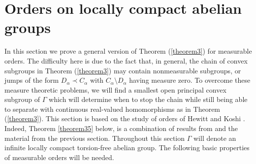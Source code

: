 





\section{Orders on locally compact abelian groups}
%
\newtheorem{theorem3.1}{Theorem}[section]
\newtheorem{remark3.2}[theorem3.1]{Remark}
\newtheorem{addedlemma}[theorem3.1]{Lemma}
\newtheorem{theorem3.3}[theorem3.1]{Theorem}
\newtheorem{remarks3.4}[theorem3.1]{Remarks}
\newtheorem{proposition31}[theorem3.1]{Proposition}
\newtheorem{lemma31}[theorem3.1]{Lemma}
\newtheorem{theorem32}[theorem3.1]{Theorem}
\newtheorem{theorem33}[theorem3.1]{Theorem}
\newtheorem{theorem34}[theorem3.1]{Theorem}
\newtheorem{theorem35}[theorem3.1]{Theorem}
\newtheorem{theorem36}[theorem3.1]{Theorem}
%
%
In this section we prove a general version 
of Theorem (\ref{theorem3}) for measurable orders.  
%
The difficulty here is due to 
the fact that, in general, the chain
of convex subgroups in Theorem (\ref{theorem3})
may contain nonmeasurable 
subgroups, or jumps of the form $D_\alpha\prec C_\alpha$
with $C_\alpha\setminus D_\alpha$ having measure zero.
To overcome these measure theoretic problems, we will
find a smallest open principal convex subgroup
of $\Gamma$ which will determine when to stop the chain
while still being able to separate with
continuous real-valued homomorphisms as in Theorem
 (\ref{theorem3}).  
 This section is based on the
 study of orders of Hewitt and Koshi \cite{hk}.
 Indeed, Theorem \ref{theorem35} 
 below, is a combination of results from \cite{hk} and the
 material from the previous section.
%
% 
%
Throughout this section $\Gamma$ will 
denote an infinite locally compact torsion-free 
abelian group.  
The following
basic properties of measurable orders will be needed.

